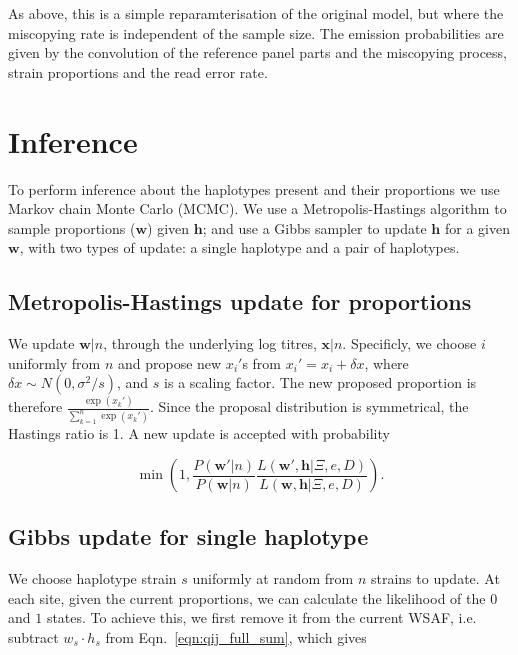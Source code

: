 \documentclass{nature}
\begin{document}
\noindent As above, this is a simple reparamterisation of the original model, but where the miscopying rate is independent of the sample size. The emission probabilities are given by the convolution of the reference panel parts and the miscopying process, strain proportions and the read error rate.




\section*{Inference}

To perform inference about the haplotypes present and their proportions we use Markov chain Monte Carlo (MCMC). We use a Metropolis-Hastings algorithm to sample proportions ($\mathbf w$) given $\mathbf h$; and use a Gibbs sampler to update $\mathbf h$ for a given $\mathbf w$, with two types of update: a single haplotype and a pair of haplotypes.


\subsection*{Metropolis-Hastings update for proportions}\label{sec:updateP}

We update $\mathbf{w}|n$, through the underlying log titres, $\mathbf{x}|n$. Specificly, we choose $i$ uniformly from $n$ and propose new $x_i'$s from $x_i' = x_i + \delta x$, where $\delta x \sim N(0, \sigma^2/s)$, and $s$ is a scaling factor. The new proposed proportion is therefore $\frac{\exp(x_k')}{\sum_{k=1}^n \exp(x_k')}$. Since the proposal distribution is symmetrical, the Hastings ratio is 1. A new update is accepted with probability

 $$\min\left(1, \frac{P(\mathbf{w}'|n)}{P(\mathbf{w}|n)} \frac{L(\mathbf{w}', \mathbf{h} | \Xi, e, D)}{L(\mathbf{w}, \mathbf{h} | \Xi, e, D)}\right).$$



\subsection*{Gibbs update for single haplotype}

We choose haplotype strain $s$ uniformly at random from $n$ strains to update.  At each site, given the current proportions, we can calculate the likelihood of the $0$ and $1$ states.  To achieve this, we first remove it from the current WSAF, i.e. subtract $ w_s \cdot h_s$ from Eqn.~\eqref{eqn:qij_full_sum}, which gives
\end{document}
